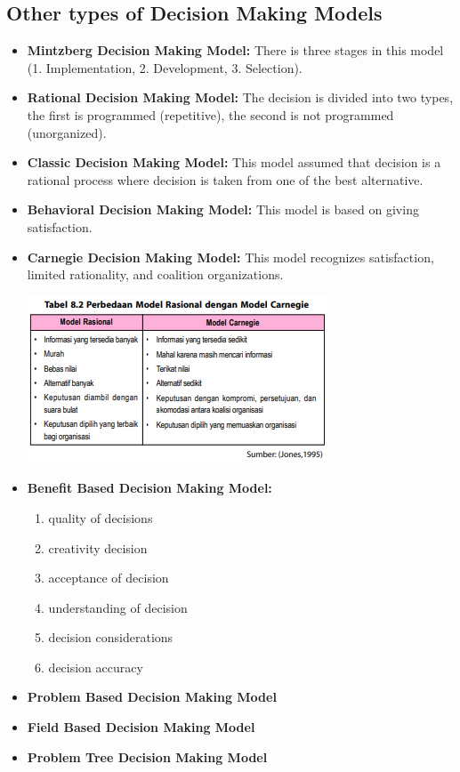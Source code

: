 \documentclass[12pt,titlepage]{article}
\begin{document}
\subsection{Other types of Decision Making Models}
\begin{itemize}
    \item \textbf{Mintzberg Decision Making Model:} There is three stages in this model (1. Implementation, 2. Development, 3. Selection).
    \item \textbf{Rational Decision Making Model:} The decision is divided into two types, the first is programmed (repetitive), the second is not programmed (unorganized).
    \item \textbf{Classic Decision Making Model:} This model assumed that decision is a rational process where decision is taken from one of the best alternative.
    \item \textbf{Behavioral Decision Making Model:} This model is based on giving satisfaction.
    \newpage
    \item \textbf{Carnegie Decision Making Model:} This model recognizes satisfaction, limited rationality, and coalition organizations.
    \begin{center}
        \includegraphics[width=.9\textwidth]{images/figures/fig2.png}
    \end{center}
    \item \textbf{Benefit Based Decision Making Model:} 
    \begin{enumerate}
        \item quality of decisions
        \item creativity decision
        \item acceptance of decision
        \item understanding of decision
        \item decision considerations
        \item decision accuracy
    \end{enumerate}
    \item \textbf{Problem Based Decision Making Model}
    \item \textbf{Field Based Decision Making Model}
    \item \textbf{Problem Tree Decision Making Model}
\end{itemize}
\end{document}
